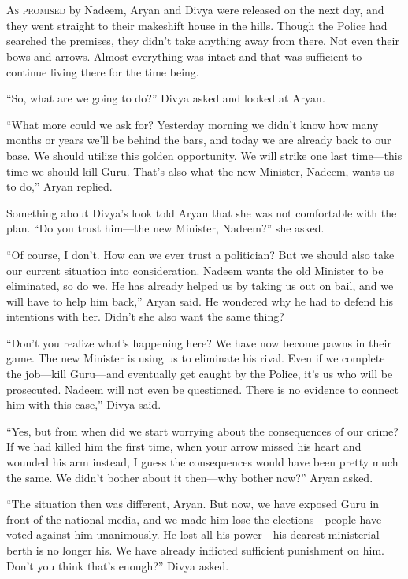 \chapter{}

\lettrine{A}{s promised} by Nadeem, Aryan and Divya were released on the next
day, and they
went straight to their makeshift house in the hills. Though the Police had
searched the premises, they didn't take anything away from there. Not even their
bows and arrows. Almost everything was intact and that was sufficient to
continue living there for the time being.

“So, what are we going to do?” Divya asked and looked at Aryan.

“What more could we ask for? Yesterday morning we didn't know how many months or
years we'll be behind the bars, and today we are already back to our base. We
should utilize this golden opportunity. We will strike one last time—this time
we should kill Guru. That's also what the new Minister, Nadeem, wants us to do,”
Aryan replied.

Something about Divya's look told Aryan that she was not comfortable with the
plan. “Do you trust him—the new Minister, Nadeem?” she asked.

“Of course, I don't. How can we ever trust a politician? But we should also take
our current situation into consideration. Nadeem wants the old Minister to be
eliminated, so do we. He has already helped us by taking us out on bail, and we
will have to help him back,” Aryan said. He wondered why he had to defend his
intentions with her. Didn't she also want the same thing?

“Don't you realize what's happening here? We have now become pawns in their
game. The new Minister is using us to eliminate his rival. Even if we complete
the job—kill Guru—and eventually get caught by the Police, it's us who will
be prosecuted. Nadeem will not even be questioned. There is no evidence to
connect him with this case,” Divya said.

“Yes, but from when did we start worrying about the consequences of our crime?
If we had killed him the first time, when your arrow missed his heart and
wounded his arm instead, I guess the consequences would have been pretty much
the same. We didn't bother about it then—why bother now?” Aryan asked.

“The situation then was different, Aryan. But now, we have exposed Guru in front
of the national media, and we made him lose the elections—people have voted
against him unanimously. He lost all his power—his dearest ministerial berth
is no longer his. We have already inflicted sufficient punishment on him. Don't
you think that's enough?” Divya asked.

